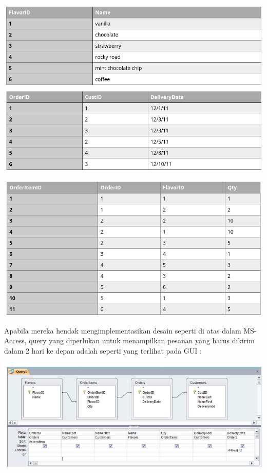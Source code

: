 \documentclass[]{book}
\begin{document}
\includegraphics{./img/tab5_order.png}
\includegraphics{./img/tab6_order.png}

\includegraphics{./img/tab7_order.png}

Apabila mereka hendak mengimplementasikan desain seperti di atas dalam MS-Access, query yang diperlukan untuk menampilkan pesanan yang harus dikirim dalam 2 hari ke depan adalah seperti yang terlihat pada GUI :

\includegraphics{./img/tab8_order.png}
\end{document}
